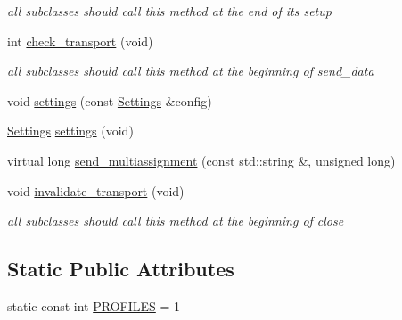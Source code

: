 \begin{DoxyCompactItemize}
\begin{DoxyCompactList}\small\item\em all subclasses should call this method at the end of its setup \item\end{DoxyCompactList}\item 
int \hyperlink{classMadara_1_1Transport_1_1Base_af4ce175b7152c0c3666e128cbbe96e97}{check\_\-transport} (void)
\begin{DoxyCompactList}\small\item\em all subclasses should call this method at the beginning of send\_\-data \item\end{DoxyCompactList}\item 
void \hyperlink{classMadara_1_1Transport_1_1Base_a3a5fdc2b43d9840dbcf48aab4bc636ac}{settings} (const \hyperlink{classMadara_1_1Transport_1_1Settings}{Settings} \&config)
\item 
\hyperlink{classMadara_1_1Transport_1_1Settings}{Settings} \hyperlink{classMadara_1_1Transport_1_1Base_a6febe337ae99f9376bdb3ec05899db00}{settings} (void)
\item 
virtual long \hyperlink{classMadara_1_1Transport_1_1Base_a5ecd1526eae6409ee19e97e8547da092}{send\_\-multiassignment} (const std::string \&, unsigned long)
\item 
void \hyperlink{classMadara_1_1Transport_1_1Base_a5feac684397b5098708ba9d16e8f1306}{invalidate\_\-transport} (void)
\begin{DoxyCompactList}\small\item\em all subclasses should call this method at the beginning of close \item\end{DoxyCompactList}\end{DoxyCompactItemize}
\subsection*{Static Public Attributes}
\begin{DoxyCompactItemize}
\item 
static const int \hyperlink{classMadara_1_1Transport_1_1TCP__Transport_a927538615b34ce9fa62c571a83592974}{PROFILES} = 1
\end{DoxyCompactItemize}
